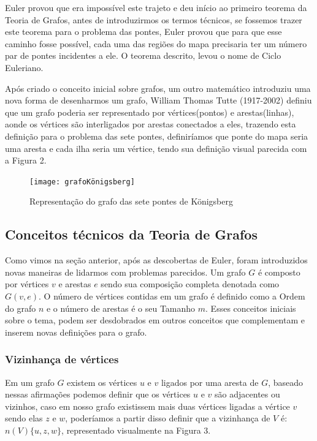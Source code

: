 \documentclass[12pt]{article}
\begin{document}
	Euler provou que era impossível este trajeto e deu início ao primeiro teorema da Teoria de Grafos, antes de introduzirmos os termos técnicos, se fossemos trazer este teorema para o problema das pontes, Euler provou que para que esse caminho fosse possível, cada uma das regiões do mapa precisaria ter um número par de pontes incidentes a ele. O teorema descrito, levou o nome de Ciclo Euleriano.
	
	Após criado o conceito inicial sobre grafos, um outro matemático introduziu uma nova forma de desenharmos um grafo, William Thomas Tutte (1917-2002) definiu que um grafo poderia ser representado por vértices(pontos) e arestas(linhas), aonde os vértices são interligados por arestas conectados a eles, trazendo esta definição para o problema das sete pontes, definiríamos que ponte do mapa seria uma aresta e cada ilha seria um vértice, tendo sua definição visual parecida com a Figura 2.
	
	
   \begin{figure}[!htb]
		\centering
		\texttt{[image: grafoKönigsberg]}
		\caption{Representação do grafo das sete pontes de Königsberg}    
	\end{figure}


	\subsection{Conceitos técnicos da Teoria de Grafos}
    Como vimos na seção anterior, após as descobertas de Euler, foram introduzidos novas maneiras de lidarmos com problemas parecidos.
	Um grafo $G$ é composto por vértices $v$ e arestas $e$ sendo sua composição completa denotada como $G (v, e)$. O número de vértices contidas em um grafo é definido como a Ordem do grafo $n$ e o número de arestas é o seu Tamanho $m$. Esses conceitos iniciais sobre o tema, podem ser desdobrados em outros conceitos que complementam e inserem novas definições para o grafo.
	
	\subsubsection{Vizinhança de vértices}
	
	Em um grafo $G$ existem os vértices $u$ e $v$ ligados por uma aresta de $G$, baseado nessas afirmações podemos definir que os vértices $u$ e $v$ são adjacentes ou vizinhos, caso em nosso grafo existissem mais duas vértices ligadas a vértice $v$ sendo elas $z$ e $w$, poderíamos a partir disso definir que a vizinhança de $V$ é: $n (V) \{u, z, w\}$, representado visualmente na Figura 3. 
		
\end{document}
